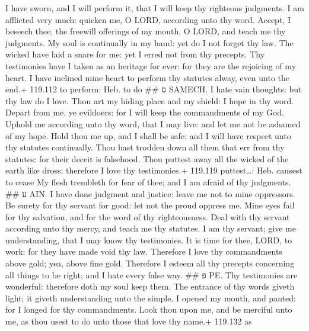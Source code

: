  I have sworn, and I will perform it, that I will keep thy
righteous judgments.  I am afflicted very much: quicken
me, O LORD, according unto thy word.  Accept, I beseech
thee, the freewill offerings of my mouth, O LORD, and teach me thy
judgments.  My soul is continually in my hand: yet do I
not forget thy law.  The wicked have laid a snare for me:
yet I erred not from thy precepts.  Thy testimonies have I
taken as an heritage for ever: for they are the rejoicing of my heart.
 I have inclined mine heart to perform thy statutes alway,
even unto the end.+ 119.112 to perform: Heb. to do \#\# ס SAMECH.
 I hate vain thoughts: but thy law do I love.
 Thou art my hiding place and my shield: I hope in thy
word.  Depart from me, ye evildoers: for I will keep the
commandments of my God.  Uphold me according unto thy
word, that I may live: and let me not be ashamed of my hope.
 Hold thou me up, and I shall be safe: and I will have
respect unto thy statutes continually.  Thou hast trodden
down all them that err from thy statutes: for their deceit is falsehood.
 Thou puttest away all the wicked of the earth like dross:
therefore I love thy testimonies.+ 119.119 puttest\ldots: Heb. causest
to cease  My flesh trembleth for fear of thee; and I am
afraid of thy judgments. \#\# ע AIN.  I have done judgment
and justice: leave me not to mine oppressors.  Be surety
for thy servant for good: let not the proud oppress me. 
Mine eyes fail for thy salvation, and for the word of thy righteousness.
 Deal with thy servant according unto thy mercy, and teach
me thy statutes.  I am thy servant; give me understanding,
that I may know thy testimonies.  It is time for thee,
LORD, to work: for they have made void thy law.  Therefore
I love thy commandments above gold; yea, above fine gold. 
Therefore I esteem all thy precepts concerning all things to be right;
and I hate every false way. \#\# פ PE.  Thy testimonies
are wonderful: therefore doth my soul keep them.  The
entrance of thy words giveth light; it giveth understanding unto the
simple.  I opened my mouth, and panted: for I longed for
thy commandments.  Look thou upon me, and be merciful unto
me, as thou usest to do unto those that love thy name.+ 119.132 as
